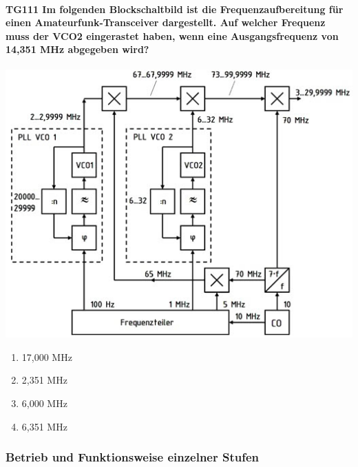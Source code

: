 \documentclass[8pt]{article}
\begin{document}
\paragraph*{TG111 Im folgenden Blockschaltbild ist die Frequenzaufbereitung für einen Amateurfunk-Transceiver dargestellt. Auf welcher Frequenz muss der VCO2 eingerastet haben, wenn eine Ausgangsfrequenz von 14,351 MHz abgegeben wird?}
\begin{center}
	\begin{minipage}{\linewidth}
		\centering
		\includegraphics[scale=1.0]{pics/tg111_a.jpg}
	\end{minipage}
\end{center}
\begin{enumerate}[nolistsep,label=\Alph*]
\item 17,000 MHz
\item 2,351 MHz
\item 6,000 MHz
\item 6,351 MHz
\end{enumerate}

\pagebreak
\subsubsection{Betrieb und Funktionsweise einzelner Stufen} 
\end{document}
